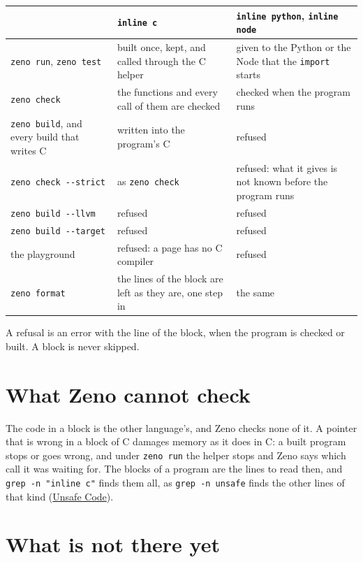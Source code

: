 \begin{center}
\begin{tabular}{P{4.2cm}P{4.2cm}P{4.2cm}}
\toprule
 & \verb|inline c| & \verb|inline python|, \verb|inline node| \\
\midrule
\verb|zeno run|, \verb|zeno test| & built once, kept, and called
  through the C helper & given to the Python or the Node that the
  \verb|import| starts \\
\verb|zeno check| & the functions and every call of them are
  checked & checked when the program runs \\
\verb|zeno build|, and every build that writes C & written into the
  program's C & refused \\
\verb|zeno check --strict| & as \verb|zeno check| & refused: what it
  gives is not known before the program runs \\
\verb|zeno build --llvm| & refused & refused \\
\verb|zeno build --target| & refused & refused \\
the playground & refused: a page has no C compiler & refused \\
\verb|zeno format| & the lines of the block are left as they are, one
  step in & the same \\
\bottomrule
\end{tabular}
\end{center}

A refusal is an error with the line of the block, when the program is
checked or built. A block is never skipped.

\section{What Zeno cannot check}

The code in a block is the other language's, and Zeno checks none of
it. A pointer that is wrong in a block of C damages memory as it does
in C: a built program stops or goes wrong, and under \verb|zeno run|
the helper stops and Zeno says which call it was waiting for. The
blocks of a program are the lines to read then, and
\verb|grep -n "inline c"| finds them all, as \verb|grep -n unsafe|
finds the other lines of that kind (\hyperref[ch-unsafe]{Unsafe Code}).

\section{What is not there yet}

